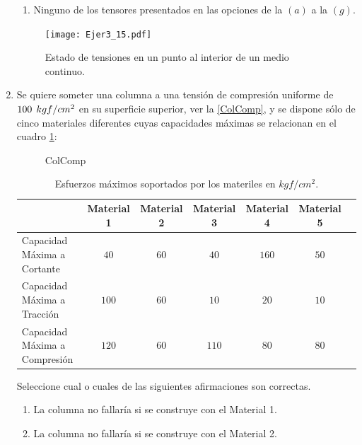 \documentclass[../notas medios.tex]{subfiles}
\begin{document}
\begin{enumerate}
\begin{enumerate}
		\item Ninguno de los tensores presentados en las opciones de la $(a)$ a la $(g)$.
	\end{enumerate}
%
\begin{figure}[H]
	\centering
	\texttt{[image: Ejer3\_15.pdf]}
	\caption{Estado de tensiones en un punto al interior de un medio continuo.}
	\label{otro:esta}
\end{figure}
%
\item \label{punto16} Se quiere someter una columna a una tensi\'on de
compresi\'on uniforme de $100\hspace{.15cm} kgf/cm^2$ en su superficie superior, ver la  \cref{ColComp}, y se dispone s\'olo de cinco materiales diferentes cuyas capacidades m\'aximas se relacionan en el cuadro \cref{tab:materiales}:
%
\begin{figure}[H]
	\centering
		\hspace{2.0cm}
	\caption{ ColComp}
\end{figure}
%
\begin{table}[H]
\begin{center}
    \begin{tabular}{ | l | c | c | c | c | c | p{10cm} |}
    \hline
     & Material 1 & Material 2 & Material 3 & Material 4 & Material 5 \\ \hline
    Capacidad M\'axima a Cortante & $40$ & $60$ & $40$ & $160$ & $50$\\ \hline
    Capacidad M\'axima a Tracci\'on & $100$ & $60$ & $10$ & $20$ & $10$\\ \hline   
    Capacidad M\'axima a Compresi\'on & $120$ & $60$ & $110$ & $80$ & $80$\\ \hline     
   \end{tabular}
\end{center}
\caption {Esfuerzos m\'aximos soportados por los materiles en $kgf/cm^2$.} \label{tab:materiales} 
\end{table}
%
Seleccione cual o cuales de las siguientes afirmaciones son correctas.
%
\begin{enumerate}
	\item La columna no fallar\'ia si se construye con el Material 1.
	\item La columna no fallar\'ia si se construye con el Material 2.

\end{enumerate}
\end{enumerate}
\end{document}

